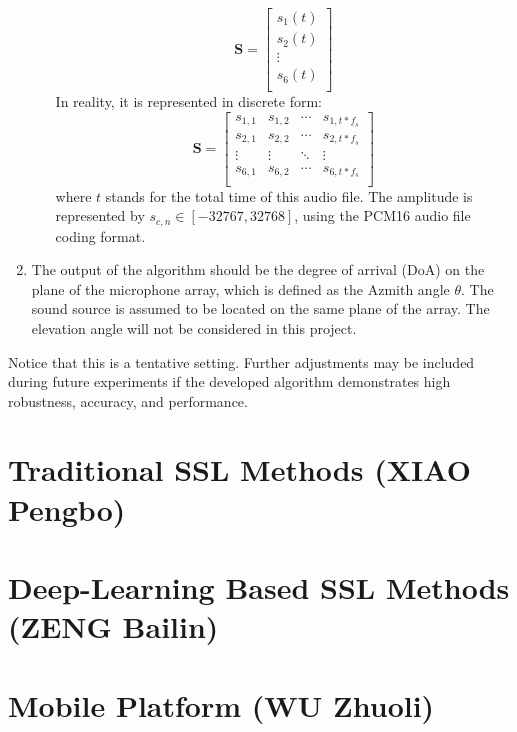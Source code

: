 \begin{enumerate}
\begin{itemize}
        \[
            \mathbf{S} = 
            \begin{bmatrix}
                s_1(t)\\
                s_2(t)\\
                \vdots\\
                s_6(t)\\
            \end{bmatrix}
        \]
        In reality, it is represented in discrete form:
        \[
            \mathbf{S} = 
            \begin{bmatrix}
                s_{1,1} & s_{1,2} & \cdots & s_{1,t*f_s} \\
                s_{2,1} & s_{2,2} & \cdots & s_{2,t*f_s} \\
                \vdots & \vdots & \ddots & \vdots \\
                s_{6,1} & s_{6,2} & \cdots & s_{6,t*f_s} \\
            \end{bmatrix}
        \]
        where \(t\) stands for the total time of this audio file. The amplitude is represented by \(s_{c,n} \in [-32767, 32768]\), using the PCM16 audio file coding format.
        
    \end{itemize}
    \item The output of the algorithm should be the degree of arrival (DoA) on the plane of the microphone array, which is defined as the Azmith angle \(\theta\). The sound source is assumed to be located on the same plane of the array. The elevation angle will not be considered in this project.

\end{enumerate}

Notice that this is a tentative setting. Further adjustments may be included during future experiments if the developed algorithm demonstrates high robustness, accuracy, and performance.


\section*{Traditional SSL Methods (XIAO Pengbo)}



\section*{Deep-Learning Based SSL Methods (ZENG Bailin)}



\section*{Mobile Platform (WU Zhuoli)}

